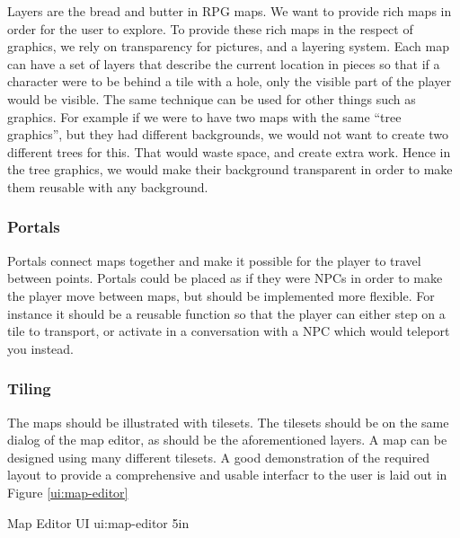 Layers are the bread and butter in RPG maps. We want to provide rich maps in
order for the user to explore. To provide these rich maps in the respect of
graphics, we rely on transparency for pictures, and a layering system. Each
map can have a set of layers that describe the current location in pieces so
that if a character were to be behind a tile with a hole, only the visible part
of the player would be visible. The same technique can be used for other things
such as graphics. For example if we were to have two maps with the same ``tree
graphics'', but they had different backgrounds, we would not want to create two
different trees for this. That would waste space, and create extra work. Hence
in the tree graphics, we would make their background transparent in order to
make them reusable with any background.

\subsubsection{Portals}

Portals connect maps together and make it possible for the player to travel
between points. Portals could be placed as if they were NPCs in order to make
the player move between maps, but should be implemented more flexible. For
instance it should be a reusable function so that the player can either step
on a tile to transport, or activate in a conversation with a NPC which would
teleport you instead.

\subsubsection{Tiling}

The maps should be illustrated with tilesets. The tilesets should be on the
same dialog of the map editor, as should be the aforementioned layers. A map
can be designed using many different tilesets. A good demonstration of the
required layout to provide a comprehensive and usable interfacr to the user
is laid out in Figure \ref{ui:map-editor}


%
       {Map Editor UI}%
       {ui:map-editor}%
       {5in}


